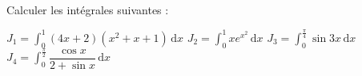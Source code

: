 
\begin{exercice}\label{exoautoanalyseCTU-16}


Calculer les intégrales suivantes : 

$J_{1}=\displaystyle\int_{0}^{1}(4x+2)(x^2+x+1) \,\mathrm dx$ 
\qquad $J_{2}=\displaystyle\int_{0}^{1}xe^{x^2} \,\mathrm dx$ 
\qquad $J_{3}=\displaystyle\int_{0}^{\frac{\pi}{4}}\sin 3x \,\mathrm dx$ 
\qquad $J_{4}=\displaystyle\int_{0}^{\frac{\pi}{2}}\dfrac{\cos x}{2+\sin x} \,\mathrm dx$ 






\end{exercice}
